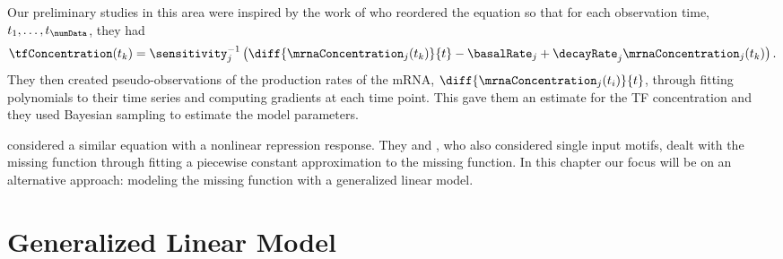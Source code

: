 \documentclass{article}
\begin{document}
Our preliminary studies in this area were inspired by
the work of \cite{Barenco:ranked06} who reordered the equation so that for each observation time, $t_1, \dots, t_\numData$, they had
\[
\tfConcentration(t_k) = \sensitivity_j^{-1}\left(\diff{\mrnaConcentration_j(t_k)}{t} - \basalRate_j + \decayRate_j \mrnaConcentration_j(t_k)\right). 
\]
They then created pseudo-observations of the production rates of the mRNA, $\diff{\mrnaConcentration_j(t_i)}{t}$, through
fitting polynomials to their time series and computing gradients at each time point. This gave them an estimate for the TF concentration and they used Bayesian sampling to estimate the model parameters.

\cite{Khanin:repression06} considered a similar equation with a
nonlinear repression response. They and \cite{Rogers:model06b}, who
also considered single input motifs, dealt with the missing function
through fitting a piecewise constant approximation to the missing
function. In this chapter our focus will be on an alternative
approach: modeling the missing function with a generalized linear
model.

\section{Generalized Linear Model}
\end{document}

